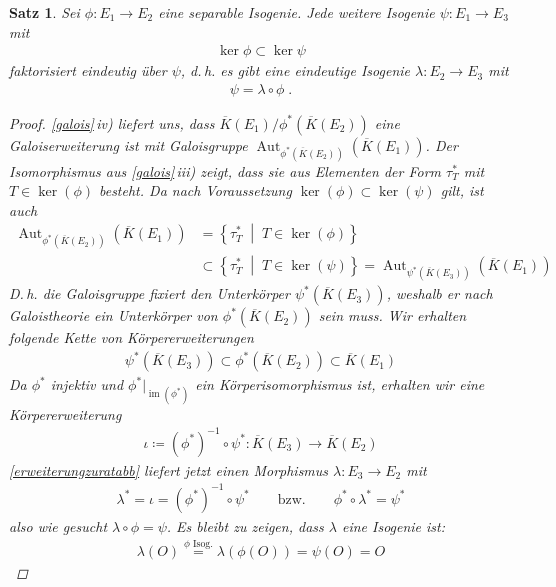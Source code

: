 \documentclass[english, german, parskip=half]{scrartcl}
\newtheorem{Satz}{Satz}[section]
\theoremstyle{definition}
\theoremstyle{remark}
\newcommand*{\algK}{\ensuremath{\overline K}} %
\newcommand*{\longto}{\longrightarrow}
\DeclareMathOperator{\Aut}{Aut} %
\DeclareMathOperator{\im}{im} %
\begin{document}
\begin{Satz}
  Sei $\phi\colon E_1\to E_2$ eine separable Isogenie.
  Jede weitere Isogenie $\psi\colon E_1\to E_3$ mit
  \begin{gather*}
    \ker\phi \subset \ker\psi
  \end{gather*}
  faktorisiert eindeutig über $\psi$, d.\,h. es gibt eine eindeutige
  Isogenie $\lambda\colon E_2\to E_3$ mit
  \begin{gather*}
    \psi = \lambda\circ\phi\;.
  \end{gather*}
  \begin{proof}
    \autoref{galois}\,iv) liefert uns, dass
    $\algK(E_1)/\phi^*(\algK(E_2))$ eine Galoiserweiterung ist mit
    Galoisgruppe $\Aut_{\phi^*(\algK(E_2))}(\algK(E_1))$.
    Der Isomorphismus aus \autoref{galois}\,iii) zeigt, dass sie aus
    Elementen der Form $\tau_T^*$ mit $T\in\ker(\phi)$ besteht.
    Da nach Voraussetzung $\ker(\phi)\subset\ker(\psi)$ gilt,
    ist auch
    \begin{align*}
      \Aut_{\phi^*(\algK(E_2))}(\algK(E_1))
      &= \left\{ \tau_T^* \;\middle|\; T\in\ker(\phi) \right\} \\
      &\subset
      \left\{ \tau_T^* \;\middle|\; T\in\ker(\psi) \right\}
      = \Aut_{\psi^*(\algK(E_3))}(\algK(E_1))
    \end{align*}
    D.\,h. die Galoisgruppe fixiert den Unterkörper
    $\psi^*(\algK(E_3))$, weshalb er nach Galoistheorie ein
    Unterkörper von $\phi^*(\algK(E_2))$ sein muss.
    Wir erhalten folgende Kette von Körpererweiterungen
    \begin{gather*}
      \psi^*(\algK(E_3)) 
      \subset \phi^*(\algK(E_2)) 
      \subset \algK(E_1)
    \end{gather*}
    Da $\phi^*$ injektiv und $\phi^*|_{\im(\phi^*)}$ ein
    Körperisomorphismus ist, erhalten wir eine Körpererweiterung
    \begin{gather*}
      \iota\coloneqq 
      (\phi^*)^{-1} \circ \psi^*
      \colon \algK(E_3) \longto \algK(E_2)
    \end{gather*}
    \autoref{erweiterungzuratabb} liefert jetzt einen Morphismus
    $\lambda\colon E_3\to E_2$ mit
    \begin{gather*}
      \lambda^* = \iota = (\phi^*)^{-1} \circ \psi^*
      \qquad\text{bzw.}\qquad
      \phi^*\circ\lambda^* = \psi^*
    \end{gather*}
    also wie gesucht $\lambda\circ\phi = \psi$.
    Es bleibt zu zeigen, dass $\lambda$ eine Isogenie ist:
    \begin{gather*}
      \lambda(O) 
      \overset{\text{$\phi$ Isog.}}{=} \lambda(\phi(O))
      = \psi(O) 
      = O
    \end{gather*}
  \end{proof}
\end{Satz}
\end{document}
